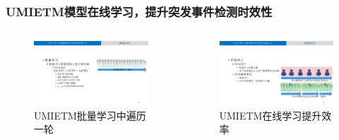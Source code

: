 \begin{frame}
\frametitle{UMIETM模型在线学习，提升突发事件检测时效性}
\vspace{-6mm}
\begin{columns}
\begin{column}{0.48\paperwidth}
	\begin{figure}
		\setlength{\abovecaptionskip}{0.cm}
		\setlength{\belowcaptionskip}{0.cm}
		\caption{UMIETM批量学习中遍历一轮}
		\includegraphics[width=\textwidth]{img/UMIETM/batch_learning.pdf}
	\end{figure}
\end{column}

\begin{column}{0.48\paperwidth}
	\begin{figure}
		\setlength{\abovecaptionskip}{0.cm}
		\setlength{\belowcaptionskip}{0.cm}
		\caption{UMIETM在线学习提升效率}
		\includegraphics[width=\textwidth]{img/UMIETM/online_learning.pdf}
	\end{figure}
\end{column}	
\end{columns}


\end{frame}
